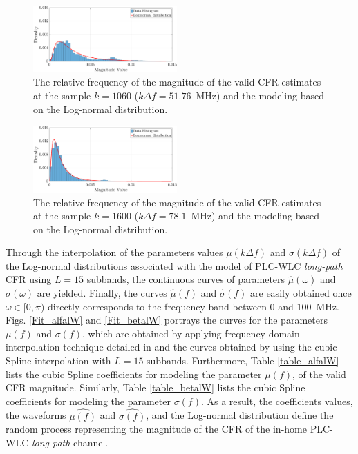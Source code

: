 \documentclass[journal]{IEEEtran}
\begin{document}
\begin{figure}[h!]
	\centering
	\includegraphics[width=0.49\textwidth]{images/Mag_histlW_2.eps}
	\caption{The relative frequency of the magnitude of the valid CFR estimates at the sample $k = 1060$ ($k\Delta f= 51.76$~MHz) and the modeling based on the Log-normal distribution.}
	\label{mag_examplelW}
\end{figure}

\begin{figure}[h!]
	\centering
	\includegraphics[width=0.49\textwidth]{images/Mag_hist2lW_2.eps}
	\caption{ The relative frequency of the magnitude of the valid CFR estimates at the sample $k = 1600$ ($k\Delta f= 78.1$~MHz) and the modeling based on the Log-normal distribution.}
	\label{mag_example2lW}
\end{figure}

Through the interpolation of the parameters values $\mu(k\Delta f)$ and $\sigma(k\Delta f)$ of the Log-normal distributions associated with the model of \ac{PLC}-\ac{WLC} \textit{long-path} \ac{CFR} using $L=15$ subbands, the continuous curves of parameters $\hat{\mu}(\omega)$ and $\hat{\sigma}(\omega)$ are yielded. Finally, the curves $\hat{\mu}(f)$ and $\hat{\sigma}(f)$ are easily obtained once $\omega \in [0,\pi)$ directly corresponds to the frequency band between $0$ and $100$~MHz. Figs. \ref{Fit_alfalW} and \ref{Fit_betalW} portrays the curves for the parameters $\mu(f)$ and $\sigma(f)$, which are obtained by applying frequency domain interpolation technique detailed in \cite{mitra} and the curves obtained by using the cubic Spline interpolation with $L=15$ subbands. Furthermore, Table \ref{table_alfalW} lists the cubic Spline coefficients for modeling the parameter $\mu(f)$, of the valid \ac{CFR} magnitude. Similarly, Table \ref{table_betalW} lists the cubic Spline coefficients for modeling the parameter $\sigma(f)$. As a result, the coefficients values, the waveforms  $\hat{\mu(f)}$ and $\hat{\sigma(f)}$, and the Log-normal distribution define the random process representing the magnitude of the \ac{CFR} of the in-home \ac{PLC}-\ac{WLC} \textit{long-path} channel.
\end{document}
